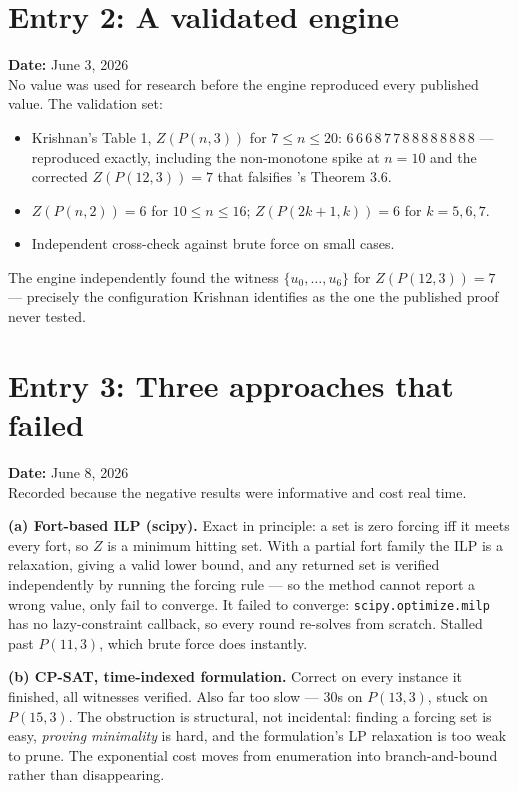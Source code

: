 \documentclass[12pt]{article}
\begin{document}
\clearpage
\section*{Entry 2: A validated engine}
\textbf{Date:} June 3, 2026\\
No value was used for research before the engine reproduced every published
value. The validation set:
\begin{itemize}[leftmargin=*]
\item Krishnan's Table 1, $Z(P(n,3))$ for $7\le n\le20$:
$6\,6\,6\,8\,7\,7\,8\,8\,8\,8\,8\,8\,8\,8$ --- reproduced exactly, including
the non-monotone spike at $n=10$ and the corrected $Z(P(12,3))=7$ that
falsifies \cite{RST}'s Theorem 3.6.
\item $Z(P(n,2))=6$ for $10\le n\le16$; $Z(P(2k+1,k))=6$ for $k=5,6,7$.
\item Independent cross-check against brute force on small cases.
\end{itemize}
The engine independently found the witness $\{u_0,\dots,u_6\}$ for
$Z(P(12,3))=7$ --- precisely the configuration Krishnan identifies as the one
the published proof never tested.


\clearpage
\section*{Entry 3: Three approaches that failed}
\textbf{Date:} June 8, 2026\\
Recorded because the negative results were informative and cost real time.

\textbf{(a) Fort-based ILP (scipy).} Exact in principle: a set is zero forcing
iff it meets every fort, so $Z$ is a minimum hitting set. With a partial fort
family the ILP is a relaxation, giving a valid lower bound, and any returned
set is verified independently by running the forcing rule --- so the method
cannot report a wrong value, only fail to converge. It failed to converge:
\texttt{scipy.optimize.milp} has no lazy-constraint callback, so every round
re-solves from scratch. Stalled past $P(11,3)$, which brute force does
instantly.

\textbf{(b) CP-SAT, time-indexed formulation.} Correct on every instance it
finished, all witnesses verified. Also far too slow --- $30$s on $P(13,3)$,
stuck on $P(15,3)$. The obstruction is structural, not incidental: finding a
forcing set is easy, \emph{proving minimality} is hard, and the formulation's
LP relaxation is too weak to prune. The exponential cost moves from enumeration
into branch-and-bound rather than disappearing.
\end{document}
